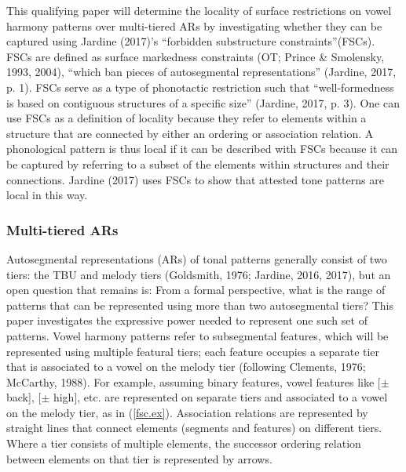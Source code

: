\documentclass[,doc,floatsintext]{apa6}
\theoremstyle{definition}
\theoremstyle{definition}
\theoremstyle{definition}
\theoremstyle{remark}
\begin{document}
This qualifying paper will determine the locality of surface
restrictions on vowel harmony patterns over multi-tiered ARs by
investigating whether they can be captured using Jardine (2017)'s
\enquote{forbidden substructure constraints}(FSCs). FSCs are defined as
surface markedness constraints (OT; Prince \& Smolensky, 1993, 2004),
\enquote{which ban pieces of autosegmental representations} (Jardine,
2017, p. 1). FSCs serve as a type of phonotactic restriction such that
\enquote{well-formedness is based on contiguous structures of a specific
size} (Jardine, 2017, p. 3). One can use FSCs as a definition of
locality because they refer to elements within a structure that are
connected by either an ordering or association relation. A phonological
pattern is thus local if it can be described with FSCs because it can be
captured by referring to a subset of the elements within structures and
their connections. Jardine (2017) uses FSCs to show that attested tone
patterns are local in this way.

\subsubsection{Multi-tiered ARs}\label{multi-tiered-ars}

Autosegmental representations (ARs) of tonal patterns generally consist
of two tiers: the TBU and melody tiers (Goldsmith, 1976; Jardine, 2016,
2017), but an open question that remains is: From a formal perspective,
what is the range of patterns that can be represented using more than
two autosegmental tiers? This paper investigates the expressive power
needed to represent one such set of patterns. Vowel harmony patterns
refer to subsegmental features, which will be represented using multiple
featural tiers; each feature occupies a separate tier that is associated
to a vowel on the melody tier (following Clements, 1976; McCarthy,
1988). For example, assuming binary features, vowel features like
{[}\(\pm\) back{]}, {[}\(\pm\) high{]}, etc. are represented on separate
tiers and associated to a vowel on the melody tier, as in
(\ref{fsc.ex}). Association relations are represented by straight lines
that connect elements (segments and features) on different tiers. Where
a tier consists of multiple elements, the successor ordering relation
between elements on that tier is represented by arrows.

\begin{exe}
\ex \label{fsc.ex}
\end{exe}
\end{document}
